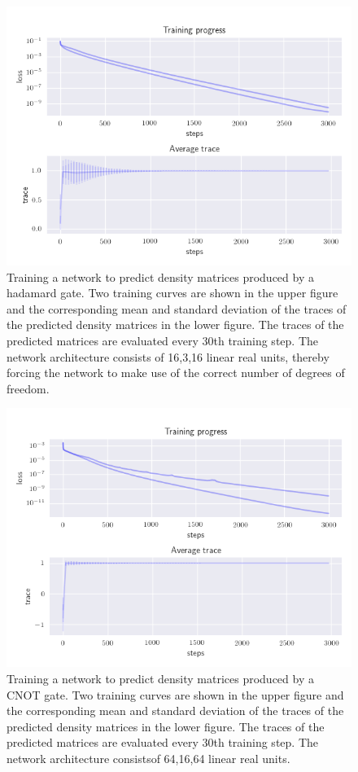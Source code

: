 \documentclass[a4paper]{article}
\begin{document}
\begin{figure}
\includegraphics[width=\linewidth]{../figures/density/hadamard/sweep_density_matrix-hadamard_gate.png}
\caption{Training a network to predict density matrices produced by a hadamard gate. Two training
curves are shown in the upper figure and the corresponding mean and standard deviation of the
traces of the predicted density matrices in the lower figure. The traces of the predicted matrices are 
evaluated every 30th training step. The network architecture consists of 16,3,16 linear real units, thereby
forcing the network to make use of the correct number of degrees of freedom.}
\label{fig:density_hadamard}
\end{figure}

\begin{figure}
\includegraphics[width=\linewidth]{../figures/density/cnot/sweep_density_matrix-cnot_gate.png}
\caption{Training a network to predict density matrices produced by a CNOT gate. Two training
curves are shown in the upper figure and the corresponding mean and standard deviation of the
traces of the predicted density matrices in the lower figure. The traces of the predicted matrices are
evaluated every 30th training step. The network architecture consistsof 64,16,64 linear real units.}
\label{fig:density_hadamard}
\end{figure}
\end{document}
